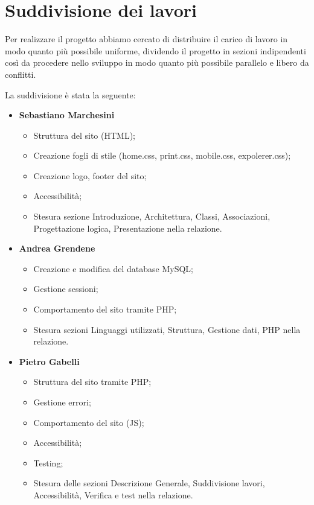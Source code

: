 \section{Suddivisione dei lavori}{
	Per realizzare il progetto abbiamo cercato di distribuire il carico di lavoro in modo quanto più possibile uniforme, dividendo il progetto in sezioni indipendenti così da procedere nello sviluppo in modo quanto più possibile parallelo e libero da conflitti.
	
	La suddivisione è stata la seguente: 	
	\begin{itemize}\itemsep1pt
		\item \textbf{Sebastiano Marchesini} 
		\begin{itemize}\itemsep1pt
			\item Struttura del sito (HTML);
			\item Creazione fogli di stile (home.css, print.css, mobile.css, expolerer.css);
			\item Creazione logo, footer del sito;
			\item Accessibilità;
			\item Stesura sezione Introduzione, Architettura, Classi, Associazioni, Progettazione logica, Presentazione nella relazione.
		\end{itemize}
		\item \textbf{Andrea Grendene}
		\begin{itemize}\itemsep1pt
			\item Creazione e modifica del database MySQL;
			\item Gestione sessioni;
			\item Comportamento del sito tramite PHP;
			\item Stesura sezioni Linguaggi utilizzati, Struttura, Gestione dati, PHP nella relazione.
		\end{itemize}
		\item \textbf{Pietro Gabelli}
		\begin{itemize}\itemsep1pt
			\item Struttura del sito tramite PHP;
			\item Gestione errori;
			\item Comportamento del sito (JS);
			\item Accessibilità;
			\item Testing;
			\item Stesura delle sezioni Descrizione Generale, Suddivisione lavori, Accessibilità, Verifica e test nella relazione.
		\end{itemize}
	\end{itemize}
}